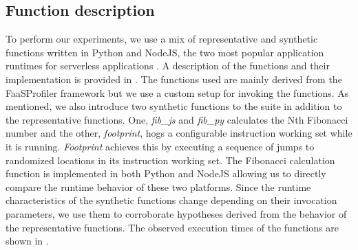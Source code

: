 \subsection{Function description}
\label{wosc:subsec:work_desc}
To perform our experiments, we use a mix of representative and synthetic functions written in Python and NodeJS, the two most popular application runtimes for serverless applications \cite{serverless_state}. A description of the functions and their implementation is provided in . The functions used are mainly derived from the FaaSProfiler framework \cite{shahrad19_archit_implic_funct_servic_comput} but we use a custom setup for invoking the functions. As mentioned, we also introduce two synthetic functions to the suite in addition to the representative functions. One, \emph{fib\_js} and \emph{fib\_py} calculates the Nth Fibonacci number and the other, \emph{footprint}, hogs a configurable instruction working set while it is running. \emph{Footprint} achieves this by executing a sequence of jumps to randomized locations in its instruction working set. The Fibonacci calculation function is implemented in both Python and NodeJS allowing us to directly compare the runtime behavior of these two platforms. Since the runtime characteristics of the synthetic functions change depending on their invocation parameters, we use them to corroborate hypotheses derived from the behavior of the representative functions. The observed execution times of the functions are shown in .




